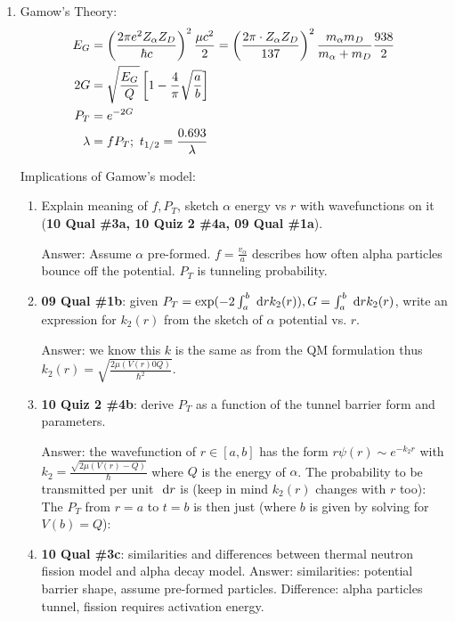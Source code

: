 \documentclass{school-22.101-notes}
\begin{document}
\begin{enumerate}
\item Gamow's Theory:
    \begin{align}
    E_G &= \left(\frac{2 \pi e^2 Z_{\alpha} Z_D}{\hbar c}\right)^2 \frac{\mu c^2}{2} = \left( \frac{2 \pi \cdot Z_{\alpha} Z_D}{137} \right)^2 \frac{m_{\alpha} m_D}{m_{\alpha} + m_D} \frac{938}{2} \\
    2G &= \sqrt{\frac{E_G}{Q}} \left[ 1 - \frac{4}{\pi} \sqrt{\frac{a}{b}} \right] \\
    P_T &= e^{-2G} \\
    \lambda &= f P_T; \mbox{ } t_{1/2} = \frac{0.693}{\lambda} 
    \end{align}

Implications of Gamow's model:
\begin{enumerate}
\item Explain meaning of $f, P_T$, sketch $\alpha$ energy vs $r$ with wavefunctions on it (\textbf{10 Qual \#3a, 10 Quiz 2 \#4a, 09 Qual \#1a}). 

Answer: Assume $\alpha$ pre-formed. $f = \frac{v_{\alpha}}{a}$ describes how often alpha particles bounce off the potential. $P_T$ is tunneling probability. 

\item \textbf{09 Qual \#1b}: given $P_T = \exp (- 2 \int_a^b \mbox{ }\mathrm{d} r k_2(r)), G = \int_a^b \mbox{ }\mathrm{d} r k_2 (r)$, write an expression for $k_2(r)$ from the sketch of $\alpha$ potential vs. $r$. 

Answer: we know this $k$ is the same as from the QM formulation thus $\displaystyle k_2 (r) = \sqrt{ \frac{2 \mu (V(r) 0 Q)}{\hbar^2}}$. 

\item \textbf{10 Quiz 2 \#4b}: derive $P_T$ as a function of the tunnel barrier form and parameters. 

Answer: the wavefunction of $r \in [a,b]$ has the form $r \psi(r) \sim e^{-k_2 r}$ with $k_2 = \frac{\sqrt{2\mu (V(r) - Q)}}{\hbar}$ where $Q$ is the energy of $\alpha$. The probability to be transmitted per unit $\mbox{ }\mathrm{d} r$ is (keep in mind $k_2(r)$ changes with $r$ too): 
The $P_T$ from $r=a$ to $t=b$ is then just (where $b$ is given by solving for $V(b) = Q$): 

\item \textbf{10 Qual \#3c}: similarities and differences between thermal neutron fission model and alpha decay model. Answer: similarities: potential barrier shape, assume pre-formed particles. Difference: alpha particles tunnel, fission requires activation energy. 


\end{enumerate}
\end{enumerate}
\end{document}
